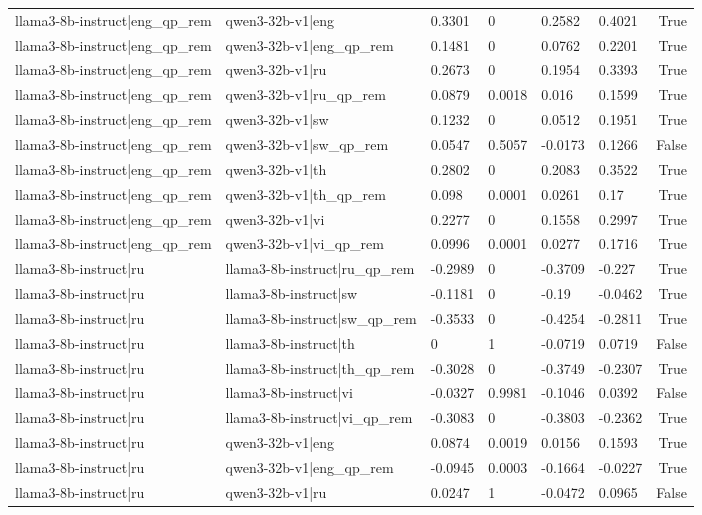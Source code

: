 \begin{table}
\begin{tabular}{llllllr}
llama3-8b-instruct|eng_qp_rem & qwen3-32b-v1|eng & 0.3301 & 0 & 0.2582 & 0.4021 & True \\
llama3-8b-instruct|eng_qp_rem & qwen3-32b-v1|eng_qp_rem & 0.1481 & 0 & 0.0762 & 0.2201 & True \\
llama3-8b-instruct|eng_qp_rem & qwen3-32b-v1|ru & 0.2673 & 0 & 0.1954 & 0.3393 & True \\
llama3-8b-instruct|eng_qp_rem & qwen3-32b-v1|ru_qp_rem & 0.0879 & 0.0018 & 0.016 & 0.1599 & True \\
llama3-8b-instruct|eng_qp_rem & qwen3-32b-v1|sw & 0.1232 & 0 & 0.0512 & 0.1951 & True \\
llama3-8b-instruct|eng_qp_rem & qwen3-32b-v1|sw_qp_rem & 0.0547 & 0.5057 & -0.0173 & 0.1266 & False \\
llama3-8b-instruct|eng_qp_rem & qwen3-32b-v1|th & 0.2802 & 0 & 0.2083 & 0.3522 & True \\
llama3-8b-instruct|eng_qp_rem & qwen3-32b-v1|th_qp_rem & 0.098 & 0.0001 & 0.0261 & 0.17 & True \\
llama3-8b-instruct|eng_qp_rem & qwen3-32b-v1|vi & 0.2277 & 0 & 0.1558 & 0.2997 & True \\
llama3-8b-instruct|eng_qp_rem & qwen3-32b-v1|vi_qp_rem & 0.0996 & 0.0001 & 0.0277 & 0.1716 & True \\
llama3-8b-instruct|ru & llama3-8b-instruct|ru_qp_rem & -0.2989 & 0 & -0.3709 & -0.227 & True \\
llama3-8b-instruct|ru & llama3-8b-instruct|sw & -0.1181 & 0 & -0.19 & -0.0462 & True \\
llama3-8b-instruct|ru & llama3-8b-instruct|sw_qp_rem & -0.3533 & 0 & -0.4254 & -0.2811 & True \\
llama3-8b-instruct|ru & llama3-8b-instruct|th & 0 & 1 & -0.0719 & 0.0719 & False \\
llama3-8b-instruct|ru & llama3-8b-instruct|th_qp_rem & -0.3028 & 0 & -0.3749 & -0.2307 & True \\
llama3-8b-instruct|ru & llama3-8b-instruct|vi & -0.0327 & 0.9981 & -0.1046 & 0.0392 & False \\
llama3-8b-instruct|ru & llama3-8b-instruct|vi_qp_rem & -0.3083 & 0 & -0.3803 & -0.2362 & True \\
llama3-8b-instruct|ru & qwen3-32b-v1|eng & 0.0874 & 0.0019 & 0.0156 & 0.1593 & True \\
llama3-8b-instruct|ru & qwen3-32b-v1|eng_qp_rem & -0.0945 & 0.0003 & -0.1664 & -0.0227 & True \\
llama3-8b-instruct|ru & qwen3-32b-v1|ru & 0.0247 & 1 & -0.0472 & 0.0965 & False \\

\end{tabular}
\end{table}

